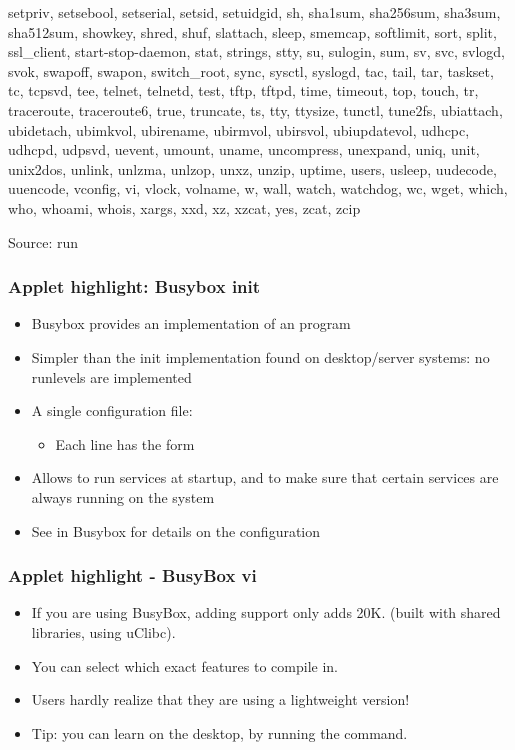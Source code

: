 \begin{frame}
\begin{spacing}{0}
{setpriv, setsebool, setserial, setsid, setuidgid, sh, sha1sum,
sha256sum, sha3sum, sha512sum, showkey, shred, shuf, slattach, sleep,
smemcap, softlimit, sort, split, ssl_client, start-stop-daemon, stat,
strings, stty, su, sulogin, sum, sv, svc, svlogd, svok, swapoff, swapon,
switch_root, sync, sysctl, syslogd, tac, tail, tar, taskset, tc, tcpsvd,
tee, telnet, telnetd, test, tftp, tftpd, time, timeout, top, touch, tr,
traceroute, traceroute6, true, truncate, ts, tty, ttysize, tunctl,
tune2fs, ubiattach, ubidetach, ubimkvol, ubirename, ubirmvol, ubirsvol,
ubiupdatevol, udhcpc, udhcpd, udpsvd, uevent, umount, uname, uncompress, unexpand, uniq,
unit, unix2dos, unlink, unlzma, unlzop, unxz, unzip, uptime, users,
usleep, uudecode, uuencode, vconfig, vi, vlock, volname, w, wall, watch,
watchdog, wc, wget, which, who, whoami, whois, xargs, xxd, xz, xzcat,
yes, zcat, zcip}
  \end{spacing}
  \vfill
  Source: run 
\end{frame}

\begin{frame}
  \frametitle{Applet highlight: Busybox init}
  \begin{itemize}
  \item Busybox provides an implementation of an  program
  \item Simpler than the init implementation found on desktop/server
    systems: no runlevels are implemented
  \item A single configuration file: 
    \begin{itemize}
    \item Each line has the form 
    \end{itemize}
  \item Allows to run services at startup, and to make sure that
    certain services are always running on the system
  \item See  in Busybox for details on the
    configuration
  \end{itemize}
\end{frame}

\begin{frame}
  \frametitle{Applet highlight - BusyBox vi}
  \begin{itemize}
  \item If you are using BusyBox, adding  support only adds
    20K. (built with shared libraries, using uClibc).
  \item You can select which exact features to compile in.
  \item Users hardly realize that they are using a lightweight 
    version!
  \item Tip: you can learn  on the desktop, by running the 
    command.
  \end{itemize}
\end{frame}


